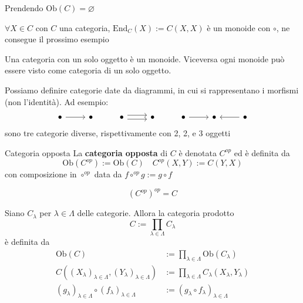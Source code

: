\begin{example}
    Prendendo \(\mathrm{Ob}{(C)} = \varnothing\)
\end{example}
\begin{remark}{}
    \(\forall X \in C\) con \(C\) una categoria, \(\mathrm{End}_C{(X)} := C{(X, X)}\) è un monoide con \(\circ\), ne consegue il prossimo esempio
\end{remark}
\begin{example}[Monoide]
    Una categoria con un solo oggetto è un monoide. Viceversa ogni monoide può
    essere visto come categoria di un solo oggetto.
\end{example}

\begin{example}[Diagrammi]
    Possiamo definire categorie date da diagrammi, in cui si rappresentano i
    morfismi (non l'identità). Ad esempio:
\[\begin{tikzcd}
	\bullet & \bullet & \bullet & \bullet & \bullet & \bullet & \bullet
	\arrow[from=1-1, to=1-2]
	\arrow[shift left, from=1-3, to=1-4]
	\arrow[shift right, from=1-3, to=1-4]
	\arrow[from=1-5, to=1-6]
	\arrow[from=1-7, to=1-6]
\end{tikzcd}\]
    sono tre categorie diverse, rispettivamente con 2, 2, e 3 oggetti
\end{example}

\begin{definition}{Categoria opposta}
    La \textbf{categoria opposta} di \(C\) è denotata \(C^{op}\) ed è definita
    da
    \[
        \mathrm{Ob}{(C^{op})} := \mathrm{Ob}{(C)} \quad C^{op}{(X, Y)} := C{(Y, X)}
    \]
    con composizione in \(\circ^{op}\) data da \(f \circ^{op} g := g \circ f\) 
\end{definition}
\begin{remark}{}
    \[
      {(C^{op})}^{op} = C
    \]
\end{remark}
\begin{example}
    Siano \(C_{\lambda} \) per \(\lambda \in \Lambda\) delle categorie. Allora
    la categoria prodotto
    \[
      C := \prod_{\lambda \in \Lambda} C_{\lambda} 
    \]
    è definita da 
    \begin{align*}
      \mathrm{Ob}{(C)} &:= \prod_{\lambda \in \Lambda} \mathrm{Ob}{(C_\lambda)} \\
      C{({(X_{\lambda} )}_{\lambda \in \Lambda}, {(Y_{\lambda} )}_{\lambda \in \Lambda} )} &:= \prod_{\lambda \in \Lambda} C_{\lambda} {(X_{\lambda} , Y_\lambda)} \\
      {(g_{\lambda} )}_{\lambda \in \Lambda} \circ {(f_{\lambda} )}_{\lambda \in \Lambda} &:= {(g_{\lambda} \circ f_{\lambda} )}_{\lambda \in \Lambda} 
    \end{align*}
\end{example}

